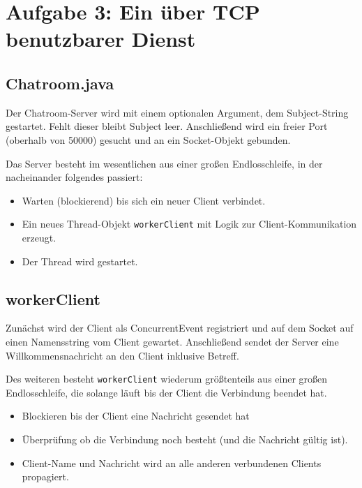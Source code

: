 \section*{Aufgabe 3: Ein über TCP benutzbarer Dienst}

\subsection*{Chatroom.java}

Der Chatroom-Server wird mit einem optionalen Argument, dem Subject-String gestartet. Fehlt dieser bleibt Subject leer. Anschließend wird ein freier Port (oberhalb von 50000) gesucht und an ein Socket-Objekt gebunden.



Das Server besteht im wesentlichen aus einer großen Endlosschleife, in der nacheinander folgendes passiert:

\begin{itemize}
\item Warten (blockierend) bis sich ein neuer Client verbindet.
\item Ein neues Thread-Objekt {\tt workerClient} mit Logik zur Client-Kommunikation erzeugt.
\item Der Thread wird gestartet.
\end{itemize}

\subsection*{workerClient}

Zunächst wird der Client als ConcurrentEvent registriert und auf dem Socket auf einen Namensstring vom Client gewartet. Anschließend sendet der Server eine Willkommensnachricht an den Client inklusive Betreff.



Des weiteren besteht {\tt workerClient} wiederum größtenteils aus einer großen Endlosschleife, die solange läuft bis der Client die Verbindung beendet hat.

\begin{itemize}
\item Blockieren bis der Client eine Nachricht gesendet hat
\item Überprüfung ob die Verbindung noch besteht (und die Nachricht gültig ist).
\item Client-Name und Nachricht wird an alle anderen verbundenen Clients propagiert.
\end{itemize}

